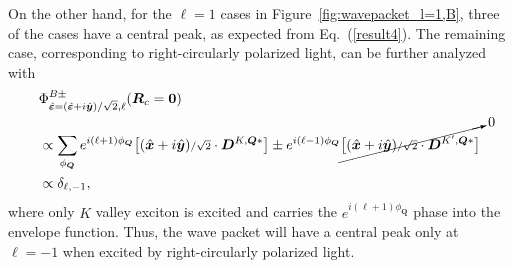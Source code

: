 On the other hand, for the $\ell=1$ cases in Figure~\ref{fig:wavepacket_l=1,B}, three of the cases have a central peak, as expected from Eq.~(\ref{result4}). The remaining case, corresponding to right-circularly polarized light, can be further analyzed with
\begin{equation}
\begin{aligned}
&\Phi^{B\pm}_{\hat{\boldsymbol{\varepsilon}}=(\hat{\boldsymbol{\varepsilon}}+i\hat{\boldsymbol{y}}){\scriptstyle /\sqrt{2}}, \ell}(\boldsymbol{R}_c=\boldsymbol{0}) \\
&\propto
\sum_{\phi_{\boldsymbol{Q}} }
e^{i(\ell + 1) \phi_{\boldsymbol{Q}}} \bigl[(\hat{\boldsymbol{x}}+i\hat{\boldsymbol{y}}){\scriptstyle /\sqrt{2}}\cdot \boldsymbol{D}^{K, \boldsymbol{Q}*} \bigr] \pm
e^{i(\ell - 1) \phi_{\boldsymbol{Q}}} \cancelto{0}{\bigl[(\hat{\boldsymbol{x}}+i\hat{\boldsymbol{y}}){\scriptstyle /\sqrt{2}}\cdot \boldsymbol{D}^{K', \boldsymbol{Q}*} \bigr]} \\
&\propto \delta_{\ell,-1} ,
\end{aligned}
\label{result5}
\end{equation}
where only $K$ valley exciton is excited and carries the $e^{i(\ell + 1) \phi_{\boldsymbol{Q}}}$ phase into the envelope function. Thus, the wave packet will have a central peak only at $\ell=-1$ when excited by right-circularly polarized light. 


